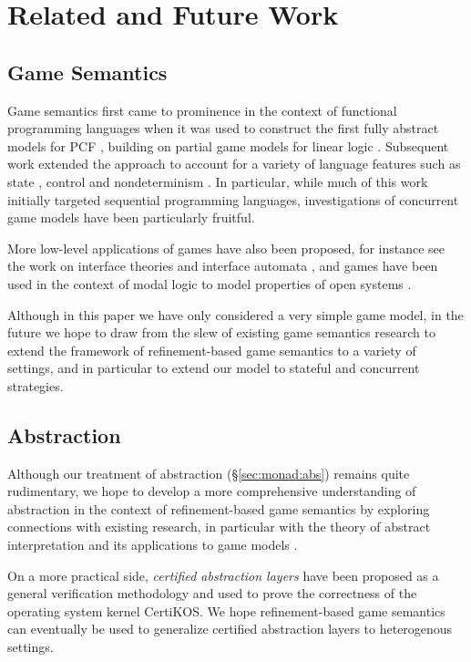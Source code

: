 \documentclass[sigplan,10pt,review,anonymous]{acmart}
\begin{document}

\section{Related and Future Work} %

\subsection{Game Semantics} %

Game semantics first came to prominence
in the context of functional programming languages when
it was used to construct
the first fully abstract models for PCF
\cite{pcfajm,pcfho},
building on partial game models for linear logic
\cite{gsll,gsllaj}.
Subsequent work
extended the approach to account for a variety of
language features such as
state \cite{gsia},
control \cite{gscontrol} and
nondeterminism \cite{gsnondet}.
In particular,
while much of this work initially
targeted sequential programming languages,
investigations of concurrent game models
have been particularly fruitful.

More low-level applications of games have also been proposed,
for instance see the work on interface theories
and interface automata \cite{ia,gmos,itcd,gtf},
and games have been used in the context of modal logic
to model properties of open systems
\cite{atl,altref}.

Although in this paper we have only considered a very simple game model,
in the future we hope to draw from the slew of existing game semantics research
to extend the framework of refinement-based game semantics
to a variety of settings,
and in particular to extend our model
to stateful and concurrent strategies.


\subsection{Abstraction} %

Although our treatment of abstraction (\S\ref{sec:monad:abs})
remains quite rudimentary,
we hope to develop a more comprehensive understanding
of abstraction in the context of refinement-based game semantics
by exploring connections with existing research,
in particular with
the theory of abstract interpretation \cite{absint,aif}
and its applications to game models \cite{aigp}.

On a more practical side,
\emph{certified abstraction layers} \cite{popl15,osdi16,ccal}
have been proposed as a general verification methodology
and used to prove the correctness of the operating system kernel CertiKOS.
We hope refinement-based game semantics
can eventually be used to generalize
certified abstraction layers to heterogenous settings.
\end{document}
